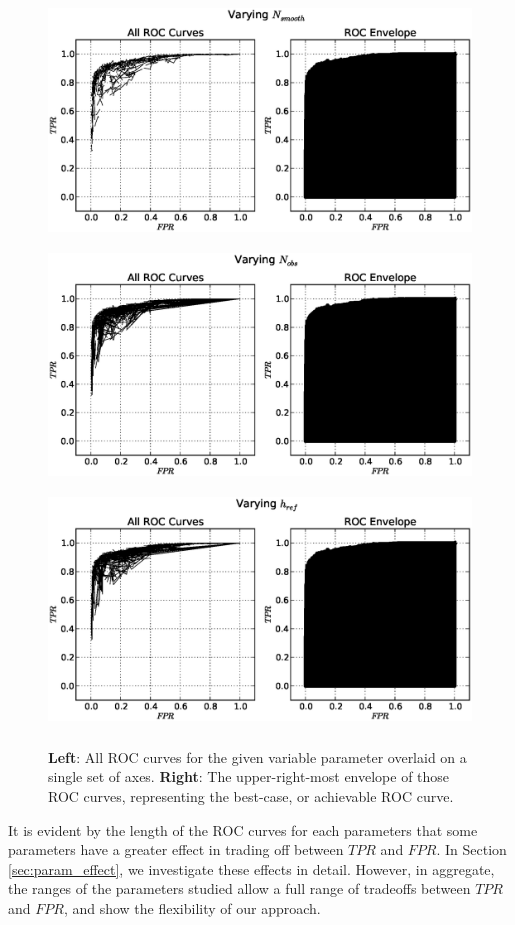 \begin{figure}[!h]
\begin{center}
\includegraphics[height=2.5in]{../fig/final/roc_env/Nsmooth}
\includegraphics[height=2.5in]{../fig/final/roc_env/nobs}
\includegraphics[height=2.5in]{../fig/final/roc_env/href}
\end{center}
\caption{\label{fig:roc_env1}  {\bf Left}: All ROC curves for the given variable
  parameter overlaid on a single set of axes. {\bf Right}: The upper-right-most
  envelope of those ROC curves, representing the best-case, or achievable ROC
  curve.  }
\end{figure}

It is evident by the length of the ROC curves for each parameters that some
parameters have a greater effect in trading off between $TPR$ and $FPR$. In
Section \ref{sec:param_effect}, we investigate these effects in detail. However,
in aggregate, the ranges of the parameters studied allow a full range of
tradeoffs between $TPR$ and $FPR$, and show the flexibility of our approach.

